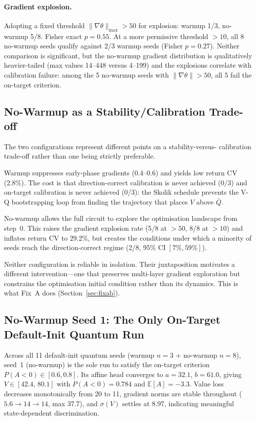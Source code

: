 \documentclass[10pt,a4paper]{article}
\begin{document}
\paragraph{Gradient explosion.}
Adopting a fixed threshold $\|\nabla\theta\|_\text{max}>50$ for explosion:
warmup 1/3, no-warmup 5/8. Fisher exact $p=0.55$.
At a more permissive threshold $>10$, all 8 no-warmup seeds qualify against
2/3 warmup seeds (Fisher $p=0.27$). Neither comparison is significant, but
the no-warmup gradient distribution is qualitatively heavier-tailed (max
values 14--448 versus 4--199) and the explosions correlate with calibration
failure: among the 5 no-warmup seeds with $\|\nabla\theta\|>50$, all 5 fail
the on-target criterion.

\subsection{No-Warmup as a Stability/Calibration Trade-off}

The two configurations represent different points on a stability-versus-
calibration trade-off rather than one being strictly preferable.

Warmup suppresses early-phase gradients (0.4--0.6) and yields low return CV
(2.8\%). The cost is that direction-correct calibration is never achieved
(0/3) and on-target calibration is never achieved (0/3): the Skolik schedule
prevents the V-Q bootstrapping loop from finding the trajectory that places
$V$ above $\bar Q$.

No-warmup allows the full circuit to explore the optimisation landscape from
step~0. This raises the gradient explosion rate (5/8 at $>50$, 8/8 at $>10$)
and inflates return CV to 29.2\%, but creates the conditions under which a
minority of seeds reach the direction-correct regime (2/8, 95\% CI
$[7\%,59\%]$).

Neither configuration is reliable in isolation. Their juxtaposition motivates
a different intervention---one that preserves multi-layer gradient exploration
but constrains the optimisation initial condition rather than its dynamics.
This is what Fix~A does (Section~\ref{sec:fixab}).

\subsection{No-Warmup Seed 1: The Only On-Target Default-Init Quantum Run}

Across all 11 default-init quantum seeds (warmup $n=3$ + no-warmup $n=8$),
seed~1 (no-warmup) is the sole run to satisfy the on-target criterion
$P(A{<}0)\in[0.6,0.8]$.
Its affine head converges to $a=32.1$, $b=61.0$, giving $V\in[42.4,\,80.1]$
with $P(A{<}0)=0.784$ and $\mathbb{E}[A]=-3.3$.
Value loss decreases monotonically from 20 to 11, gradient norms are stable
throughout ($5.6\to14\to14$, max 37.7), and $\sigma(V)$ settles at 8.97,
indicating meaningful state-dependent discrimination.
\end{document}
